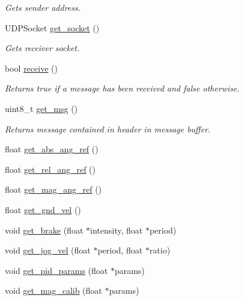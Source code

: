 \begin{DoxyCompactItemize}
\begin{DoxyCompactList}\small\item\em Gets sender address. \end{DoxyCompactList}\item 
U\+D\+P\+Socket \hyperlink{classReceiver_a03493e2745f0a9d893d72d7d8a5d4c15}{get\+\_\+socket} ()\hypertarget{classReceiver_a03493e2745f0a9d893d72d7d8a5d4c15}{}\label{classReceiver_a03493e2745f0a9d893d72d7d8a5d4c15}

\begin{DoxyCompactList}\small\item\em Gets receiver socket. \end{DoxyCompactList}\item 
bool \hyperlink{classReceiver_a07be48f1064a85b96bff4f822696c65b}{receive} ()\hypertarget{classReceiver_a07be48f1064a85b96bff4f822696c65b}{}\label{classReceiver_a07be48f1064a85b96bff4f822696c65b}

\begin{DoxyCompactList}\small\item\em Returns true if a message has been received and false otherwise. \end{DoxyCompactList}\item 
uint8\+\_\+t \hyperlink{classReceiver_a6892c16ffee2ceee17920a86413c1418}{get\+\_\+msg} ()\hypertarget{classReceiver_a6892c16ffee2ceee17920a86413c1418}{}\label{classReceiver_a6892c16ffee2ceee17920a86413c1418}

\begin{DoxyCompactList}\small\item\em Returns message contained in header in message buffer. \end{DoxyCompactList}\item 
float \hyperlink{classReceiver_a6d3a40c1fb7cbdbf68edcac5f865b4e6}{get\+\_\+abs\+\_\+ang\+\_\+ref} ()
\item 
float \hyperlink{classReceiver_abeda9ceeaf2b8bc20fce9ca26a0abcc3}{get\+\_\+rel\+\_\+ang\+\_\+ref} ()
\item 
float \hyperlink{classReceiver_af6497262041cc93fd4bfe319b1a77373}{get\+\_\+mag\+\_\+ang\+\_\+ref} ()
\item 
float \hyperlink{classReceiver_ad3e21d33eeb6e658abbbc5d3fbcc5582}{get\+\_\+gnd\+\_\+vel} ()
\item 
void \hyperlink{classReceiver_a0a94deabed7416727ace25ccaaea8d3a}{get\+\_\+brake} (float $\ast$intensity, float $\ast$period)
\item 
void \hyperlink{classReceiver_a0cd0df13d41eefce61ab0e268b4946c8}{get\+\_\+jog\+\_\+vel} (float $\ast$period, float $\ast$ratio)
\item 
void \hyperlink{classReceiver_a9bfe5dfb43d708e149f0b224a14aee05}{get\+\_\+pid\+\_\+params} (float $\ast$params)
\item 
void \hyperlink{classReceiver_ad03b0f06173febf3f0a11cf1b4fc5fc7}{get\+\_\+mag\+\_\+calib} (float $\ast$params)
\end{DoxyCompactItemize}
